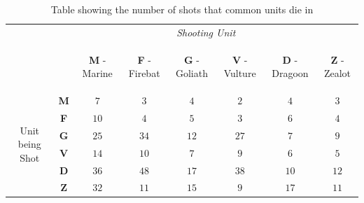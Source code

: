 \documentclass[conference]{IEEEtran}
\begin{document}
\begin{table}
  \caption{Table showing the number of shots that common units die in}
   \begin{center}
    \begin{tabular}{|c c|c|c|c|c|c|c|}
    \hline
    &\multicolumn{7}{c|}{\emph{Shooting Unit}} \\
    &&\multicolumn{1}{|c|}{\begin{sideways}{\bf M} - Marine\end{sideways}} & 
    \multicolumn{1}{|c|}{\begin{sideways}{\bf F} - Firebat\end{sideways}} & 
    \multicolumn{1}{|c|}{\begin{sideways}{\bf G} - Goliath\end{sideways}} & 
    \multicolumn{1}{|c|}{\begin{sideways}{\bf V} - Vulture\end{sideways}} & 
    \multicolumn{1}{|c|}{\begin{sideways}{\bf D} - Dragoon\end{sideways}} & 
    \multicolumn{1}{|c|}{\begin{sideways}{\bf Z} - Zealot\end{sideways}} \\
    \cline{2-8}
    \multirow{6}{*}{\begin{sideways}Unit being Shot\end{sideways}}
    &\textbf{M} & $7$     & $3$     & $4$     & $2$     & $4$     & $3$ \\
    \cline{2-8}
    &\textbf{F} & $10$    & $4$     & $5$     & $3$     & $6$     & $4$ \\
    \cline{2-8}
    &\textbf{G} & $25$    & $34$    & $12$    & $27$    & $7$     & $9$ \\
    \cline{2-8}
    &\textbf{V} & $14$    & $10$    & $7$    & $9$     & $6$     & $5$ \\
    \cline{2-8}
    &\textbf{D} & $36$    & $48$    & $17$    & $38$    & $10$    & $12$ \\
    \cline{2-8}
    &\textbf{Z} & $32$    & $11$    & $15$    & $9$     & $17$    & $11$ \\
    \hline
    \end{tabular}
  \label{table:shotTable}
 \end{center}
\end{table}
\end{document}
